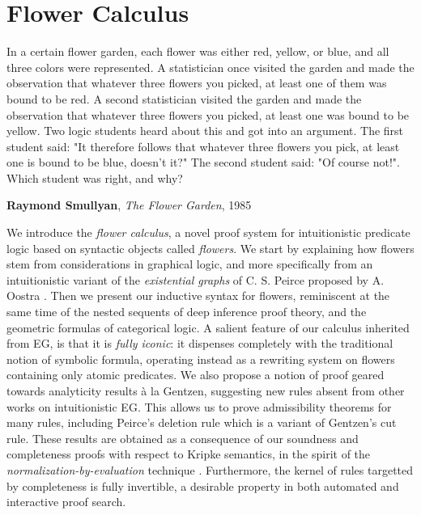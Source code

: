\setchapterpreamble[u]{\margintoc}
\chapter{Flower Calculus}

\epigraph{In a certain flower garden, each flower was either red, yellow, or
blue, and all three colors were represented. A statistician once visited the
garden and made the observation that whatever three flowers you picked, at least
one of them was bound to be red. A second statistician visited the garden and
made the observation that whatever three flowers you picked, at least one was
bound to be yellow. Two logic students heard about this and got into an
argument. The first student said: "It therefore follows that whatever three
flowers you pick, at least one is bound to be blue, doesn't it?" The second
student said: "Of course not!". Which student was right, and why?
}{\textbf{Raymond Smullyan}, \textit{The Flower Garden}, 1985}

We introduce the \emph{flower calculus}, a novel proof system for intuitionistic
predicate logic based on syntactic objects called \emph{flowers}. We start by
explaining how flowers stem from considerations in graphical logic, and more
specifically from an intuitionistic variant of the \emph{existential graphs} of
C. S. Peirce proposed by A. Oostra . Then
we present our inductive syntax for flowers, reminiscent at the same time of the
nested sequents of deep inference proof theory, and the geometric formulas of
categorical logic. A salient feature of our calculus inherited from EG, is that
it is \emph{fully iconic}: it dispenses completely with the traditional notion
of symbolic formula, operating instead as a rewriting system on flowers
containing only atomic predicates. We also propose a notion of proof geared
towards analyticity results à la Gentzen, suggesting new rules absent from other
works on intuitionistic EG. This allows us to prove admissibility theorems for
many rules, including Peirce's deletion rule which is a variant of Gentzen's cut
rule. These results are obtained as a consequence of our soundness and
completeness proofs with respect to Kripke semantics, in the spirit of the
\emph{normalization-by-evaluation} technique . Furthermore, the
kernel of rules targetted by completeness is fully invertible, a desirable
property in both automated and interactive proof search.

